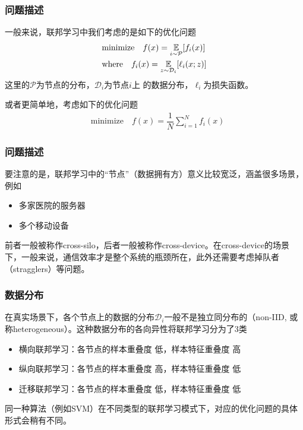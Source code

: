 \begin{frame}
\frametitle{问题描述}

一般来说，联邦学习中我们考虑的是如下的优化问题
\begin{align*}
    & \text{minimize} \quad f(x) = \operatorname*{\mathbb{E}}\limits_{i \sim {\mathcal{P}}} [f_i(x)] \\
    & \text{where} \quad f_i(x) = \operatorname*{\mathbb{E}}\limits_{z \sim \mathcal{D}_i} [\ell_i(x; z)]
\end{align*}
这里的$\mathcal{P}$为节点的分布，$\mathcal{D}_i$为节点$i$上 的数据分布，$\ell_i$为损失函数。

\pause
\vspace{1em}

或者更简单地，考虑如下的优化问题
\begin{align*}
    & \text{minimize} \quad f(x) = \dfrac{1}{N} \sum\limits_{i=1}^N f_i(x)
\end{align*}

\end{frame}


\begin{frame}
\frametitle{问题描述}

要注意的是，联邦学习中的``节点''（数据拥有方）意义比较宽泛，涵盖很多场景，例如
\begin{itemize}
    \item 多家医院的服务器
    \item 多个移动设备
\end{itemize}

\pause
\vspace{1.5em}

前者一般被称作cross-silo，后者一般被称作cross-device。在cross-device的场景下，一般来说，通信效率才是整个系统的瓶颈所在，此外还需要考虑掉队者（stragglers）等问题。

\end{frame}


\begin{frame}
\frametitle{数据分布}

在真实场景下，各个节点上的数据的分布$\mathcal{D}_i$一般不是独立同分布的（non-IID, 或称heterogeneous）。这种数据分布的各向异性将联邦学习分为了3类

\begin{itemize}
    \item 横向联邦学习：各节点的样本重叠度{\color{red} 低}，样本特征重叠度{\color{green} 高}
    \item 纵向联邦学习：各节点的样本重叠度{\color{green} 高}，样本特征重叠度{\color{red} 低}
    \item 迁移联邦学习：各节点的样本重叠度{\color{red} 低}，样本特征重叠度{\color{red} 低}
\end{itemize}

同一种算法（例如SVM）在不同类型的联邦学习模式下，对应的优化问题的具体形式会稍有不同。

\end{frame}

